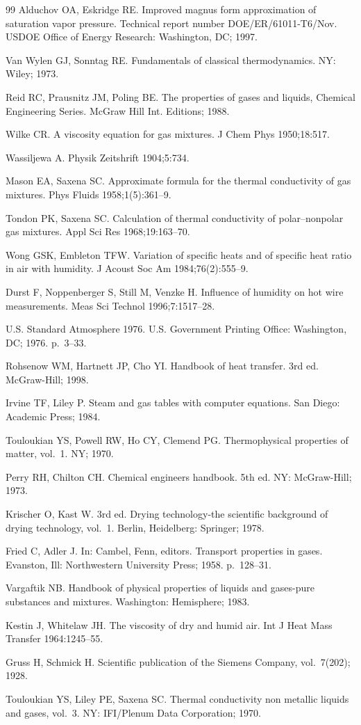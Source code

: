 \documentclass[11pt]{article}
\begin{document}
\begin{thebibliography}{99}
 Alduchov OA, Eskridge RE. Improved magnus form
approximation of saturation vapor pressure. Technical report number
DOE/ER/61011-T6/Nov. USDOE Office of Energy Research: Washington, DC;
1997.

 Van Wylen GJ, Sonntag RE. Fundamentals of classical
thermodynamics. NY: Wiley; 1973.

 Reid RC, Prausnitz JM, Poling BE. The properties of gases
and liquids, Chemical Engineering Series. McGraw Hill Int. Editions;
1988.

 Wilke CR. A viscosity equation for gas mixtures. J Chem
Phys 1950;18:517.

 Wassiljewa A. Physik Zeitshrift 1904;5:734.

 Mason EA, Saxena SC. Approximate formula for the thermal
conductivity of gas mixtures. Phys Fluids 1958;1(5):361--9.

 Tondon PK, Saxena SC. Calculation of thermal conductivity
of polar--nonpolar gas mixtures. Appl Sci Res 1968;19:163--70.

 Wong GSK, Embleton TFW. Variation of specific heats and
of specific heat ratio in air with humidity. J Acoust Soc Am
1984;76(2):555--9.

 Durst F, Noppenberger S, Still M, Venzke H. Influence of
humidity on hot wire measurements. Meas Sci Technol 1996;7:1517--28.

 U.S. Standard Atmosphere 1976. U.S. Government Printing
Office: Washington, DC; 1976. p.\ 3--33.

 Rohsenow WM, Hartnett JP, Cho YI. Handbook of heat
transfer. 3rd ed. McGraw-Hill; 1998.

 Irvine TF, Liley P. Steam and gas tables with computer
equations. San Diego: Academic Press; 1984.

 Touloukian YS, Powell RW, Ho CY, Clemend PG.
Thermophysical properties of matter, vol.\ 1. NY; 1970.

 Perry RH, Chilton CH. Chemical engineers handbook. 5th
ed. NY: McGraw-Hill; 1973.

 Krischer O, Kast W. 3rd ed. Drying technology-the
scientific background of drying technology, vol.\ 1. Berlin,
Heidelberg: Springer; 1978.

 Fried C, Adler J. In: Cambel, Fenn, editors. Transport
properties in gases. Evanston, Ill: Northwestern University Press;
1958. p.\ 128--31.

 Vargaftik NB. Handbook of physical properties of liquids
and gases-pure substances and mixtures. Washington: Hemisphere; 1983.

 Kestin J, Whitelaw JH. The viscosity of dry and humid
air. Int J Heat Mass Transfer 1964:1245--55.

 Gruss H, Schmick H. Scientific publication of the Siemens
Company, vol.\ 7(202); 1928.

 Touloukian YS, Liley PE, Saxena SC. Thermal conductivity
non metallic liquids and gases, vol.\ 3. NY: IFI/Plenum Data
Corporation; 1970.

\end{thebibliography}
\end{document}
